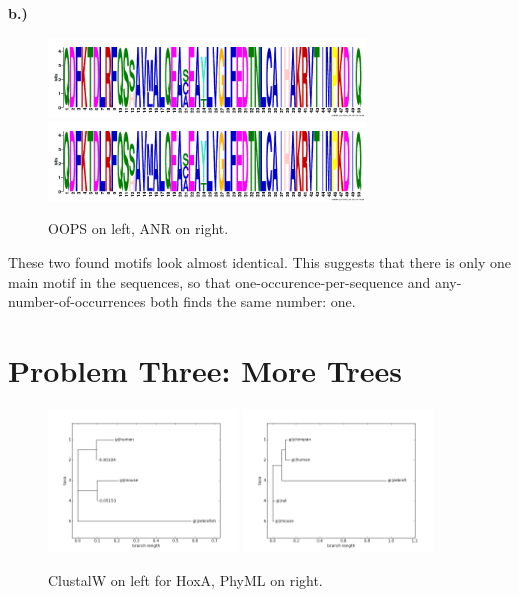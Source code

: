 \documentclass[10pt]{article} %
\begin{document}
\textbf{b.)}

\begin{figure}[h!]
  \centering
  \includegraphics[width=0.75\textwidth]{oops-logo.png}\\
  \includegraphics[width=0.75\textwidth]{anr-logo.png}
  \caption{OOPS on left, ANR on right.}
\end{figure}

These two found motifs look almost identical. This suggests that there is only one
main motif in the sequences, so that one-occurence-per-sequence and any-number-of-occurrences
both finds the same number: one.\\

\section{Problem Three: More Trees}

\begin{figure}[h!]
  \centering
  \includegraphics[width=0.45\textwidth]{clustalw.png}
  \includegraphics[width=0.45\textwidth]{phyml.png}
  \caption{ClustalW on left for HoxA, PhyML on right.}
\end{figure}
\end{document}
